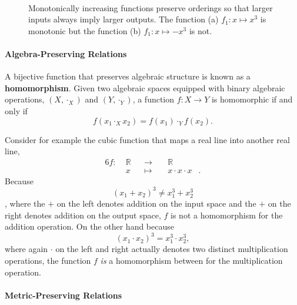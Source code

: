 \documentclass[
  letterpaper,
  DIV=11,
  numbers=noendperiod]{scrartcl}
\let\oldparagraph\paragraph
\renewcommand{\paragraph}[1]{\oldparagraph{#1}\mbox{}}
\begin{document}
\begin{figure}
\begin{minipage}[t]{0.45\linewidth}
{{}

}

\subcaption{\label{fig-non-monotonic}}
\end{minipage}%
%
\begin{minipage}[t]{0.05\linewidth}

{\centering 

~

}

\end{minipage}%

\caption{\label{fig-monoticity}Monotonically increasing functions
preserve orderings so that larger inputs always imply larger outputs.
The function (a) \(f_{1} : x \mapsto x^{3}\) is monotonic but the
function (b) \(f_{1} : x \mapsto -x^{3}\) is not.}

\end{figure}

\hypertarget{algebra-preserving-relations}{%
\paragraph{Algebra-Preserving
Relations}\label{algebra-preserving-relations}}

A bijective function that preserves algebraic structure is known as a
\textbf{homomorphism}. Given two algebraic spaces equipped with binary
algebraic operations, \((X, \cdot_{X})\) and \((Y, \cdot_{Y})\), a
function \(f : X \rightarrow Y\) is homomorphic if and only if \[
f(x_{1} \cdot_{X} x_{2}) = f(x_{1}) \cdot_{Y} f(x_{2}).
\]

Consider for example the cubic function that maps a real line into
another real line, \begin{alignat*}{6}
f :\; & \mathbb{R} & &\rightarrow& \; & \mathbb{R} &
\\
& x & &\mapsto& & x \cdot x \cdot x &.
\end{alignat*} Because \[
(x_1 + x_2)^3 \ne x_1^3 + x_2^3
\], where the \(+\) on the left denotes addition on the input space and
the \(+\) on the right denotes addition on the output space, \(f\) is
not a homomorphism for the addition operation. On the other hand because
\[
(x_1 \cdot x_2)^3 = x_1^3 \cdot x_2^3,
\] where again \(\cdot\) on the left and right actually denotes two
distinct multiplication operations, the function \(f\) \emph{is} a
homomorphism between for the multiplication operation.

\hypertarget{metric-preserving-relations}{%
\paragraph{Metric-Preserving
Relations}\label{metric-preserving-relations}}
\end{document}
